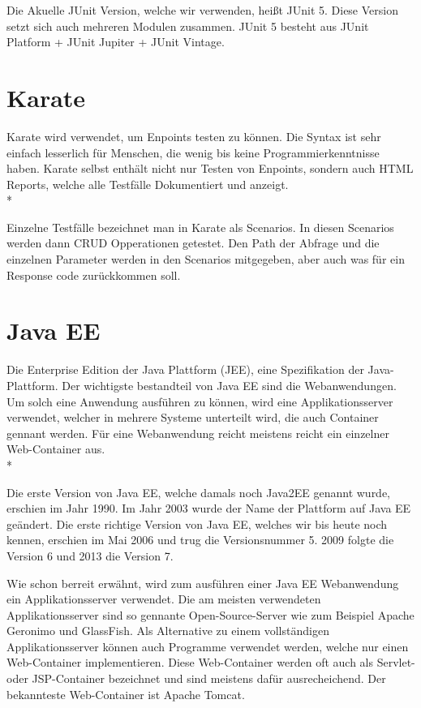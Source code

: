 Die Akuelle JUnit Version, welche wir verwenden, heißt JUnit 5. Diese Version setzt sich auch mehreren Modulen zusammen. JUnit 5 besteht aus JUnit Platform + JUnit Jupiter + JUnit Vintage.

\section{Karate}
\author{David Ignjatovic} 

Karate wird verwendet, um Enpoints testen zu können. Die Syntax ist sehr einfach lesserlich für Menschen, die wenig bis keine Programmierkenntnisse haben.
Karate selbst enthält nicht nur Testen von Enpoints, sondern auch HTML Reports, welche alle Testfälle Dokumentiert und anzeigt. \\*

Einzelne Testfälle bezeichnet man in Karate als Scenarios. In diesen Scenarios werden dann CRUD Opperationen getestet. Den Path der Abfrage und die einzelnen 
Parameter werden in den Scenarios mitgegeben, aber auch was für ein Response code zurückkommen soll.


\section{Java EE}
\author{David Ignjatovic} 

Die Enterprise Edition der Java Plattform (JEE), eine Spezifikation der Java-Plattform. 
Der wichtigste bestandteil von Java EE sind die Webanwendungen. Um solch eine Anwendung ausführen zu können, wird eine Applikationsserver verwendet, welcher 
in mehrere Systeme unterteilt wird, die auch Container gennant werden. Für eine Webanwendung reicht meistens reicht ein einzelner Web-Container aus. \\*

Die erste Version von Java EE, welche damals noch Java2EE genannt wurde, erschien im Jahr 1990. Im Jahr 2003 wurde der Name der Plattform auf Java EE geändert.
Die erste richtige Version von Java EE, welches wir bis heute noch kennen, erschien im Mai 2006 und trug die Versionsnummer 5. 2009 folgte die Version 6 und 2013 die Version 7.

Wie schon berreit erwähnt, wird zum ausführen einer Java EE Webanwendung ein Applikationsserver verwendet. Die am meisten verwendeten Applikationsserver sind so gennante 
Open-Source-Server wie zum Beispiel Apache Geronimo und GlassFish. 
Als Alternative zu einem vollständigen Applikationsserver können auch Programme verwendet werden, welche nur einen Web-Container implementieren.
Diese Web-Container werden oft auch als Servlet- oder JSP-Container bezeichnet und sind meistens dafür ausrecheichend. Der bekannteste Web-Container ist Apache Tomcat.

